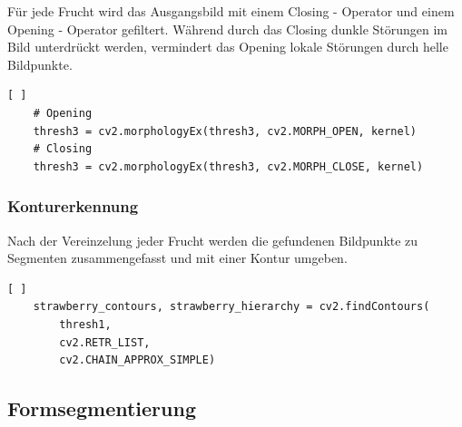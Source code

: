 Für jede Frucht wird das Ausgangsbild mit einem Closing - Operator und einem Opening - Operator gefiltert. Während durch das Closing dunkle Störungen im Bild unterdrückt werden, vermindert das Opening lokale Störungen durch helle Bildpunkte.  \\
\lstset{language=Python}
\begin{lstlisting}[ ]
    # Opening
    thresh3 = cv2.morphologyEx(thresh3, cv2.MORPH_OPEN, kernel)
    # Closing
    thresh3 = cv2.morphologyEx(thresh3, cv2.MORPH_CLOSE, kernel)
\end{lstlisting}

\subsubsection{Konturerkennung}
Nach der Vereinzelung jeder Frucht werden die gefundenen Bildpunkte zu Segmenten zusammengefasst und mit einer Kontur umgeben. 

\lstset{language=Python}
\begin{lstlisting}[ ]
    strawberry_contours, strawberry_hierarchy = cv2.findContours(
        thresh1,
        cv2.RETR_LIST,
        cv2.CHAIN_APPROX_SIMPLE)
\end{lstlisting}

\subsection{Formsegmentierung}

